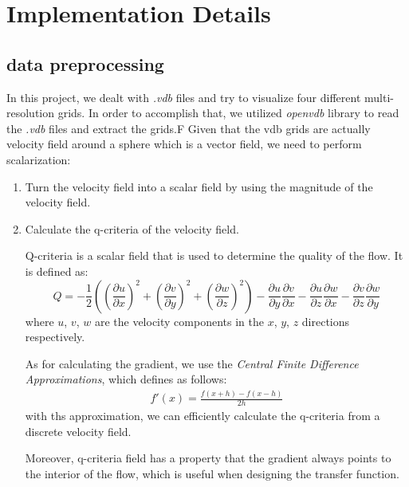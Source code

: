 \documentclass[acmtog]{acmart}
\begin{document}
    \section{Implementation Details}\label{sec:implementation-details}

    \subsection{data preprocessing}\label{subsec:data-preprocessing}
    In this project, we dealt with \emph{.vdb} files and try to visualize four different multi-resolution grids.
    In order to accomplish that, we utilized \emph{openvdb} library to read the \emph{.vdb} files and extract the grids.F
    Given that the vdb grids are actually velocity field around a sphere which is a vector field, we need to perform scalarization:
    \begin{enumerate}
        \item Turn the velocity field into a scalar field by using the magnitude of the velocity field.
        \item Calculate the q-criteria of the velocity field.
        \par Q-criteria is a scalar field that is used to determine the quality of the flow.
        It is defined as:
        \begin{equation}
            Q = -\frac{1}{2}\left( \left( \frac{\partial u}{\partial x} \right)^2 + \left( \frac{\partial v}{\partial y} \right)^2 + \left( \frac{\partial w}{\partial z} \right)^2 \right) - \frac{\partial u}{\partial y}\frac{\partial v}{\partial x} - \frac{\partial u}{\partial z}\frac{\partial w}{\partial x} - \frac{\partial v}{\partial z}\frac{\partial w}{\partial y}\label{eq:equation}
        \end{equation}
        where $u$, $v$, $w$ are the velocity components in the $x$, $y$, $z$ directions respectively.
        \par As for calculating the gradient, we use the \emph{Central Finite Difference Approximations}, which defines as follows:
        \begin{align*}
            f'(x)=\frac{f(x+h)-f(x-h)}{2h}
        \end{align*}
        with ths approximation, we can efficiently calculate the q-criteria from a discrete velocity field.
        \par Moreover, q-criteria field has a property that the gradient always points to the interior of the flow, which is useful when designing the transfer function.
    \end{enumerate}
\end{document}

